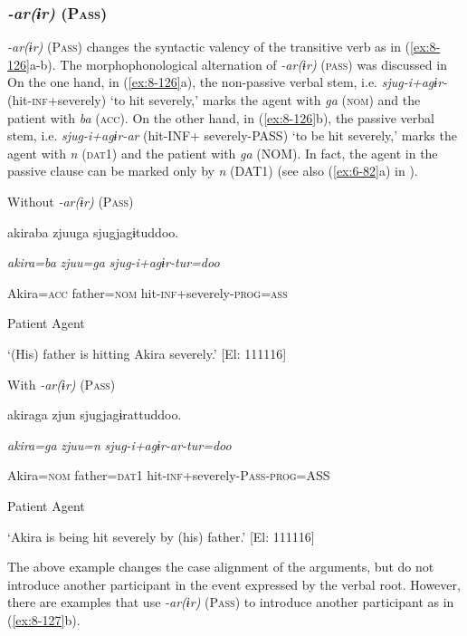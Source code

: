 \subsubsection{\textit{{}-ar(ɨr)} (P\textsc{ass})}

\textit{{}-ar(ɨr)} (P\textsc{ass}) changes the syntactic valency of the transitive verb as in (\ref{ex:8-126}a-b). The morphophonological alternation of \textit{{}-ar(ɨr)} (\textsc{pass}) was discussed in  On the one hand, in (\ref{ex:8-126}a), the non-passive verbal stem, i.e. \textit{sjug-i+agɨr-} (hit-\textsc{inf}+severely) ‘to hit severely,’ marks the agent with \textit{ga} (\textsc{nom}) and the patient with \textit{ba} (\textsc{acc}). On the other hand, in (\ref{ex:8-126}b), the passive verbal stem, i.e. \textit{sjug-i+agɨr-ar} (hit-INF+ severely-PASS) ‘to be hit severely,’ marks the agent with \textit{n} (\textsc{dat}1) and the patient with \textit{ga} (NOM). In fact, the agent in the passive clause can be marked only by \textit{n} (DAT1) (see also (\ref{ex:6-82}a) in ).

\ea\label{ex:8-126}
\ea Without \textit{{}-ar(ɨr)} (P\textsc{ass})

    {\TM}
\glll  akiraba  zjuuga  sjugjagɨtuddoo.

      \textit{akira=ba}  \textit{zjuu=ga}  \textit{sjug-i+agɨr{}-tur=doo}

      Akira=\textsc{acc}  father=\textsc{nom}  hit-\textsc{inf}+severely-\textsc{prog}=\textsc{ass}

      Patient  Agent  

\glt ‘(His) father is hitting Akira severely.’ [El: 111116]

\ex With \textit{{}-ar(ɨr)} (P\textsc{ass})

    {\TM}
\glll  akiraga  zjun  sjugjagɨrattuddoo.

      \textit{akira=ga}  \textit{zjuu=n}  \textit{sjug-i+agɨr-ar{}-tur=doo}

      Akira=\textsc{nom}  father=\textsc{dat}1  hit-\textsc{inf}+severely-P\textsc{ass}-\textsc{prog}=ASS

      Patient  Agent  

\glt ‘Akira is being hit severely by (his) father.’ [El: 111116]

  The above example changes the case alignment of the arguments, but do not introduce another participant in the event expressed by the verbal root. However, there are examples that use \textit{{}-ar(ɨr)} (P\textsc{ass}) to introduce another participant as in (\ref{ex:8-127}b).

